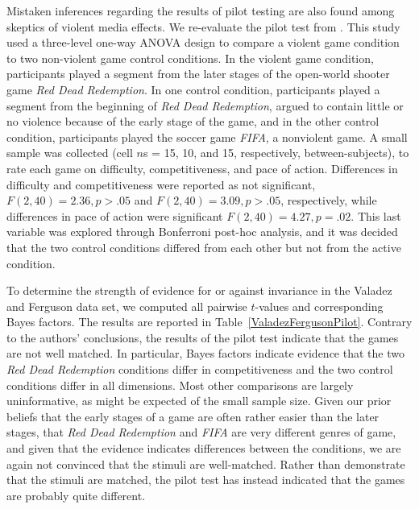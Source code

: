 \documentclass[man]{apa6}
\begin{document}
Mistaken inferences regarding the results of pilot testing are also found among skeptics of violent media effects. We re-evaluate the pilot test from \citet{Valadez:Ferguson:2012}. This study used a three-level one-way ANOVA design to compare a violent game condition to two non-violent game control conditions. In the violent game condition, participants played a segment from the later stages of the open-world shooter game {\em Red Dead Redemption}. In one control condition, participants played a segment from the beginning of {\em Red Dead Redemption}, argued to contain little or no violence because of the early stage of the game, and in the other control condition, participants played the soccer game {\em FIFA}, a nonviolent game. A small sample was collected (cell $n$s = 15, 10, and 15, respectively, between-subjects), to rate each game on difficulty, competitiveness, and pace of action. Differences in difficulty and competitiveness were reported as not significant, $F(2,40) = 2.36, p > .05$ and $F(2, 40) = 3.09, p > .05$, respectively, while differences in pace of action were significant $F(2, 40) = 4.27, p = .02$. This last variable was explored through Bonferroni post-hoc analysis, and it was decided that the two control conditions differed from each other but not from the active condition. 

To determine the strength of evidence for or against invariance in the Valadez and Ferguson data set, we computed all pairwise $t$-values and corresponding Bayes factors.  The results are reported in Table~\ref{ValadezFergusonPilot}. Contrary to the authors' conclusions, the results of the pilot test indicate that the games are not well matched. In particular, Bayes factors indicate evidence that the two {\em Red Dead Redemption} conditions differ in competitiveness and the two control conditions differ in all dimensions. Most other comparisons are largely uninformative, as might be expected of the small sample size. Given our prior beliefs that the early stages of a game are often rather easier than the later stages, that {\em Red Dead Redemption} and {\em FIFA} are very different genres of game, and given that the evidence indicates differences between the conditions, we are again not convinced that the stimuli are well-matched. Rather than demonstrate that the stimuli are matched, the pilot test has instead indicated that the games are probably quite different.
\end{document}
